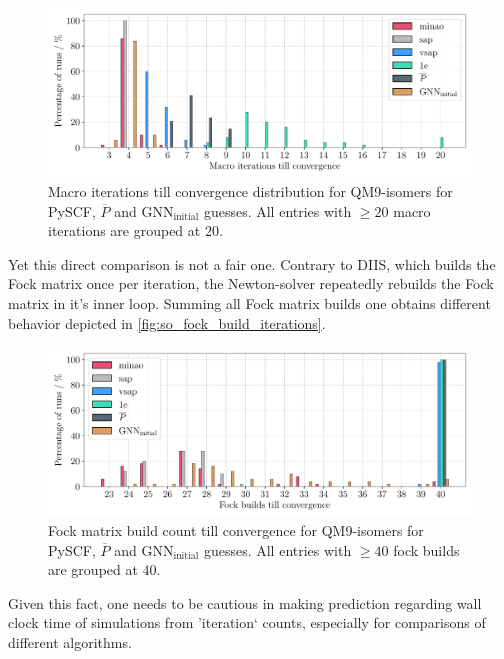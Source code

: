 \begin{figure}[H]
    \centering
    \includegraphics[width=\textwidth]{../fig/gnn/SO_0D_GNN_model_iteration_count_bar.pdf}
    \caption[Macro iterations till convergence distribution for QM9-isomers]{Macro iterations till convergence distribution for QM9-isomers for PySCF, $\overline{P}$ and GNN$_\text{initial}$ guesses. All entries with $\geq 20$ macro iterations are grouped at $20$.}
    \label{fig:so_macro_iterations}
\end{figure}
Yet this direct comparison is not a fair one. Contrary to DIIS, which builds the Fock matrix once per iteration, the Newton-solver repeatedly rebuilds the Fock matrix in it's inner loop. Summing all Fock matrix builds one obtains different behavior depicted in \autoref{fig:so_fock_build_iterations}.  
\begin{figure}[H]
    \centering
    \includegraphics[width=\textwidth]{../fig/gnn/SO_0D_GNN_model_fock_build_count_bar.pdf}
    \caption[Fock matrix build count till convergence QM9-isomers]{Fock matrix build count till convergence for QM9-isomers for PySCF, $\overline{P}$ and GNN$_\text{initial}$ guesses. All entries with $\geq 40$ fock builds are grouped at $40$.}
    \label{fig:so_fock_build_iterations}
\end{figure}
Given this fact, one needs to be cautious in making prediction regarding wall clock time of simulations from 'iteration` counts, especially for comparisons of different algorithms.

